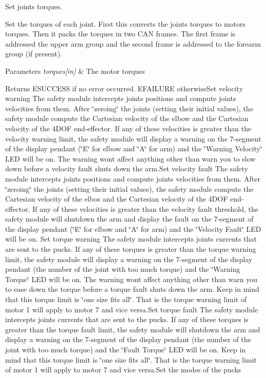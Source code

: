 Set joints torques. 

Set the torques of each joint. First this converts the joints torques to motors torques. Then it packs the torques in two C\+A\+N frames. The first frame is addressed the upper arm group and the second frame is addressed to the forearm group (if present). 
\begin{DoxyParams}{Parameters}
{\em torques\mbox{[}in\mbox{]}} & The motor torques \\
\hline
\end{DoxyParams}
\begin{DoxyReturn}{Returns}
E\+S\+U\+C\+C\+E\+S\+S if no error occurred. E\+F\+A\+I\+L\+U\+R\+E otherwise\+Set velocity warning The safety module intercepts joints positions and compute joints velocities from them. After \char`\"{}zeroing\char`\"{} the joints (setting their initial values), the safety module compute the Cartesian velocity of the elbow and the Cartesian velocity of the 4\+D\+O\+F end-\/effector. If any of these velocities is greater than the velocity warning limit, the safety module will display a warning on the 7-\/segment of the display pendant (\char`\"{}\+E\char`\"{} for elbow and \char`\"{}\+A\char`\"{} for arm) and the \char`\"{}\+Warning Velocity\char`\"{} L\+E\+D will be on. The warning won\textquotesingle{}t affect anything other than warn you to slow down before a velocity fault shuts down the arm.\+Set velocity fault The safety module intercepts joints positions and compute joints velocities from them. After \char`\"{}zeroing\char`\"{} the joints (setting their initial values), the safety module compute the Cartesian velocity of the elbos and the Cartesian velocity of the 4\+D\+O\+F end-\/effector. If any of these velocities is greater than the velocity fault threshold, the safety module will shutdown the arm and display the fault on the 7-\/segment of the display pendant (\char`\"{}\+E\char`\"{} for elbow and \char`\"{}\+A\char`\"{} for arm) and the \char`\"{}\+Velocity Fault\char`\"{} L\+E\+D will be on. Set torque warning The safety module intercepts joints currents that are sent to the pucks. If any of these torques is greater than the torque warning limit, the safety module will display a warning on the 7-\/segment of the display pendant (the number of the joint with too much torque) and the \char`\"{}\+Warning 
\+Torque\char`\"{} L\+E\+D will be on. The warning won\textquotesingle{}t affect anything other than warn you to ease down the torque before a torque fault shuts down the arm. Keep in mind that this torque limit is \char`\"{}one size fits all\char`\"{}. That is the torque warning limit of motor 1 will apply to motor 7 and vice versa.\+Set torque fault The safety module intercepts joints currents that are sent to the pucks. If any of these torques is greater than the torque fault limit, the safety module will shutdown the arm and display a warning on the 7-\/segment of the display pendant (the number of the joint with too much torque) and the \char`\"{}\+Fault Torque\char`\"{} L\+E\+D will be on. Keep in mind that this torque limit is \char`\"{}one size fits all\char`\"{}. That is the torque warning limit of motor 1 will apply to motor 7 and vice versa.\+Set the modes of the pucks 
\end{DoxyReturn}
